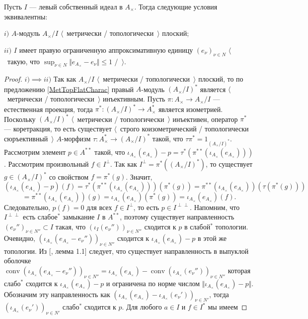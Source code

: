 \begin{proposition}\label{MetTopFlatCycModCharac} Пусть $I$ --- левый собственный идеал в $A_\times $. Тогда следующие условия эквивалентны:

$i)$ $A$-модуль $A_\times /I$ $\langle$~метрически / топологически~$\rangle$ плоский;

$ii)$ $I$ имеет правую ограниченную аппроксимативную единицу $(e_\nu)_{\nu\in N}$ $\langle$~такую, что $\sup_{\nu\in N}\Vert e_{A_\times }-e_\nu\Vert\leq 1$ /~$\rangle$.
\end{proposition}
\begin{proof} $i)$$\implies$$ ii)$  Так как $A_\times /I$ $\langle$~метрически / топологически~$\rangle$ плоский, то по предложению \ref{MetTopFlatCharac} правый $A$-модуль $(A_\times /I)^*$ является $\langle$~метрически / топологически~$\rangle$ инъективным. Пусть $\pi:A_\times \to A_\times /I$ --- естественная проекция, тогда $\pi^*:(A_\times /I)^*\to A_\times ^*$ является изометрией. Поскольку $(A_\times /I)^*$ $\langle$~метрически / топологически~$\rangle$ инъективен, оператор $\pi^*$ --- коретракция, то есть существует $\langle$~строго коизометрический / топологически сюръективный~$\rangle$ $A$-морфизм $\tau:A_\times ^*\to (A_\times /I)^*$ такой, что $\tau\pi^*=1_{(A_\times /I)^*}$. Рассмотрим элемент $p\in A^{**}$ такой, что $\iota_{A_\times }(e_{A_\times })-p=\tau^*(\pi^{**}(\iota_{A_\times }(e_{A_\times })))$. Рассмотрим произвольный $f\in I^\perp$. Так как $I^\perp=\pi^*((A_\times /I)^*)$, то существует $g\in (A_\times /I)^*$ со свойством $f=\pi^*(g)$. Значит,
$$
(\iota_{A_\times }(e_{A_\times })-p)(f)
=\tau^*(\pi^{**}(\iota_{A_\times }(e_{A_\times })))(\pi^*(g))
=\pi^{**}(\iota_{A_\times }(e_{A_\times }))(\tau(\pi^*(g)))
$$
$$
=\pi^{**}(\iota_{A_\times }(e_{A_\times }))(g)
=\iota_{A_\times }(e_{A_\times })(\pi^*(g))
=\iota_{A_\times }(e_{A_\times })(f).
$$
Следовательно, $p(f)=0$ для всех $f\in I^\perp$, то есть $p\in I^{\perp\perp}$. Напомним, что $I^{\perp\perp}$ есть слабое${}^*$ замыкание $I$ в $A^{**}$, поэтому существует направленность $(e_\nu'')_{\nu\in N''}\subset I$ такая, что $(\iota_I(e_\nu''))_{\nu\in N''}$ сходится к $p$ в слабой${}^*$ топологии. Очевидно, $(\iota_{A_\times }(e_{A_\times }-e_\nu''))_{\nu\in N''}$ сходится к  $\iota_{A_\times }(e_{A_\times })-p$ в этой же топологии. Из [\cite{PosAndApproxIdinBanAlg}, лемма 1.1] следует, что существует направленность в выпуклой оболочке $\operatorname{conv}(\iota_{A_\times }(e_{A_\times }-e_\nu''))_{\nu\in N''}=\iota_{A_\times }(e_{A_\times })-\operatorname{conv}(\iota_{A_\times }(e_\nu''))_{\nu\in N''}$ которая слабо${}^*$ сходится к $\iota_{A_\times }(e_{A_\times })-p$ и ограничена по норме числом $\Vert \iota_{A_\times }(e_{A_\times })-p\Vert$. Обозначим эту направленность как $(\iota_{A_\times }(e_{A_\times })-\iota_{A_\times }(e_\nu'))_{\nu\in N'}$, тогда $(\iota_{A_\times }(e_\nu'))_{\nu\in N'}$ слабо${}^*$ сходится к $p$. Для любого $a\in I$ и $f\in I^*$ мы имеем

\end{proof}
